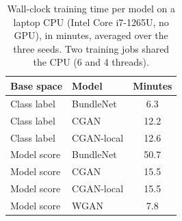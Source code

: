 \begin{table}[H]
\caption{Wall-clock training time per model on a laptop CPU (Intel Core i7-1265U, no GPU), in minutes, averaged over the three seeds. Two training jobs shared the CPU (6 and 4 threads).}
\label{tab:times}
\small
\begin{tabular}{llc}
\toprule
Base space & Model & Minutes \\
\midrule
Class label & BundleNet & 6.3 \\
Class label & CGAN & 12.2 \\
Class label & CGAN-local & 12.6 \\
Model score & BundleNet & 50.7 \\
Model score & CGAN & 15.5 \\
Model score & CGAN-local & 15.5 \\
Model score & WGAN & 7.8 \\
\bottomrule
\end{tabular}
\end{table}